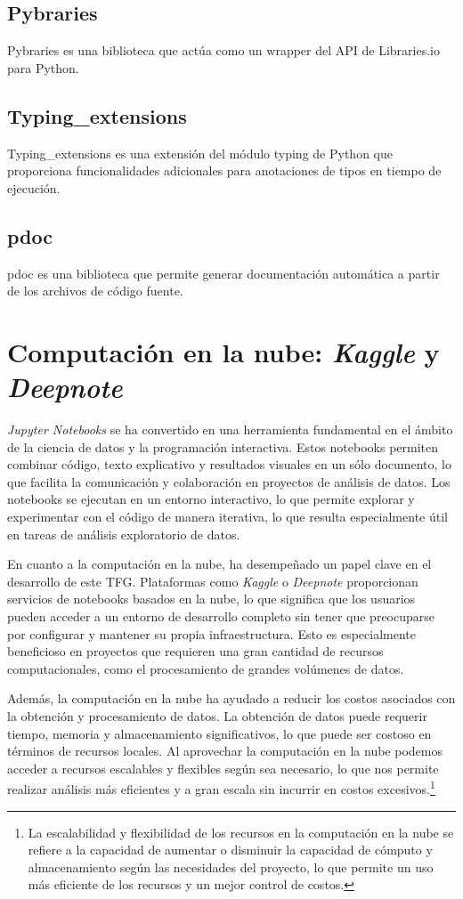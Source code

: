 \subsection{Pybraries}
Pybraries es una biblioteca que actúa como un wrapper del API de Libraries.io para Python.

\subsection{Typing\_extensions}
Typing\_extensions es una extensión del módulo typing de Python que proporciona funcionalidades adicionales para anotaciones de tipos en tiempo de ejecución.

\subsection{pdoc}
pdoc es una biblioteca que permite generar documentación automática a partir de los archivos de código fuente.

\section{Computación en la nube: \textit{Kaggle} y \textit{Deepnote}}

\textit{Jupyter Notebooks} se ha convertido en una herramienta fundamental en el ámbito de la ciencia de datos y 
la programación interactiva. Estos notebooks permiten combinar código, texto explicativo y resultados 
visuales en un sólo documento, lo que facilita la comunicación y colaboración en proyectos de análisis 
de datos. Los notebooks se ejecutan en un entorno interactivo, lo que permite explorar y experimentar 
con el código de manera iterativa, lo que resulta especialmente útil en tareas de análisis exploratorio 
de datos.

En cuanto a la computación en la nube, ha desempeñado un papel clave en el desarrollo de este TFG.
Plataformas como \textit{Kaggle} o \textit{Deepnote} proporcionan servicios de notebooks basados en la nube, lo que 
significa que los usuarios pueden acceder a un entorno de desarrollo completo sin tener que preocuparse 
por configurar y mantener su propia infraestructura. Esto es especialmente beneficioso en proyectos 
que requieren una gran cantidad de recursos computacionales, como el procesamiento de grandes volúmenes
 de datos.

Además, la computación en la nube ha ayudado a reducir los costos asociados con la obtención y 
procesamiento de datos. La obtención de datos puede requerir tiempo, memoria y almacenamiento 
significativos, lo que puede ser costoso en términos de recursos locales. Al aprovechar la computación 
en la nube podemos acceder a recursos escalables y flexibles según 
sea necesario, lo que nos permite realizar análisis más eficientes y a gran escala sin incurrir en 
costos excesivos.\footnote{La escalabilidad y flexibilidad de los recursos en la computación en la 
nube se refiere a la capacidad de aumentar o disminuir la capacidad de cómputo y almacenamiento 
según las necesidades del proyecto, lo que permite un uso más eficiente de los recursos y un mejor 
control de costos.}

